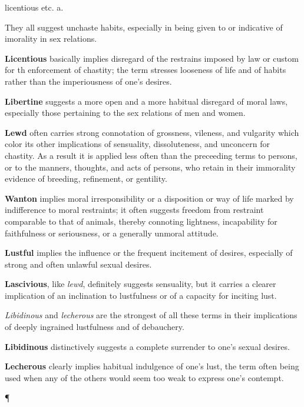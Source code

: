 \begin{description}[style=unboxed]
{licentious etc.} a.
\begin{mynewitemize}
\item They all suggest unchaste habits, especially in being given to or indicative
of imorality in sex relations.
\item \textbf{Licentious} basically implies disregard of the restrains imposed
by law or custom for th enforcement of chastity; the term stresses looseness of 
life and of habits rather than the imperiousness of one's desires.
\item \textbf{Libertine} suggests a more open and a more habitual disregard of 
moral laws, especially those pertaining to the sex relations of men and women.
\item \textbf{Lewd} often carries strong connotation of grossness, vileness, and
vulgarity which color its other implications of sensuality, dissoluteness, and
unconcern for chastity. As a result it is applied less often than the preceeding
terms to persons, or to the manners, thoughts, and acts of persons, who retain
in their immorality evidence of breeding, refinement, or gentility.
\item \textbf{Wanton} implies moral irresponsibility or a disposition or way
of life marked by indifference to moral restraints; it often suggests freedom
from restraint comparable to that of animals, thereby connoting lightness,
incapability for faithfulness or seriousness, or a generally unmoral attitude.
\item \textbf{Lustful} implies the influence or the frequent incitement of
desires, especially of strong and often unlawful sexual desires.
\item \textbf{Lascivious}, like \textit{lewd}, definitely suggests sensuality,
but it carries a clearer implication of an inclination to lustfulness or of a
capacity for inciting lust.
\item \textit{Libidinous} and \textit{lecherous} are the strongest of all 
these terms in their implications of deeply ingrained lustfulness and of
debauchery.
\item \textbf{Libidinous} distinctively suggests a complete surrender to one's
sexual desires.
\item \textbf{Lecherous} clearly implies habitual indulgence of one's lust,
the term often being used when any of the others would seem too weak to 
express one's contempt.
\item[\P]
\end{mynewitemize}




\end{description}
